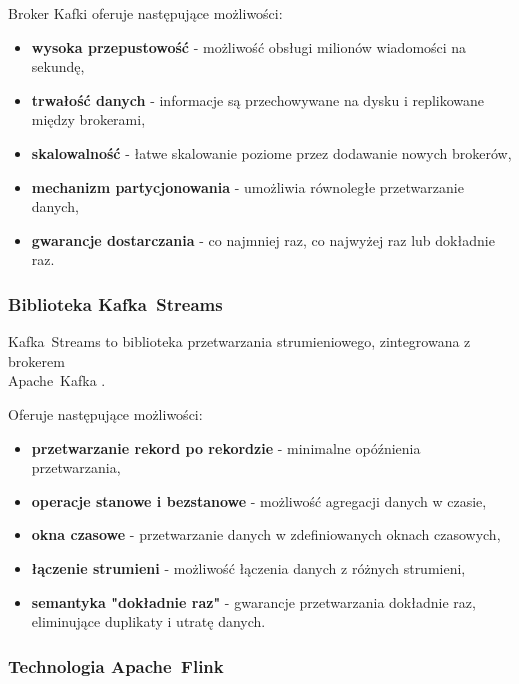 Broker Kafki oferuje następujące możliwości:

\begin{itemize}
    \item \textbf{wysoka przepustowość} - możliwość obsługi milionów wiadomości na sekundę,
    \item \textbf{trwałość danych} - informacje są przechowywane na dysku i replikowane między brokerami,
    \item \textbf{skalowalność} - łatwe skalowanie poziome przez dodawanie nowych brokerów,
    \item \textbf{mechanizm partycjonowania} - umożliwia równoległe przetwarzanie danych,
    \item \textbf{gwarancje dostarczania} - co najmniej raz, co najwyżej raz lub dokładnie raz.
\end{itemize}

\subsubsection{Biblioteka \mbox{Kafka Streams}}
\label{subsubsec:kafka_streams}

\mbox{Kafka Streams} to biblioteka przetwarzania strumieniowego, zintegrowana z brokerem \\ \mbox{Apache Kafka} \cite{kafka_streams}. 

\vspace{0.3em}

Oferuje następujące możliwości:

\begin{itemize}
    \item \textbf{przetwarzanie rekord po rekordzie} - minimalne opóźnienia przetwarzania,
    \item \textbf{operacje stanowe i bezstanowe} - możliwość agregacji danych w czasie,
    \item \textbf{okna czasowe} - przetwarzanie danych w zdefiniowanych oknach czasowych,
    \item \textbf{łączenie strumieni} - możliwość łączenia danych z różnych strumieni,
    \item \textbf{semantyka "dokładnie raz"} - gwarancje przetwarzania dokładnie raz, eliminujące duplikaty i utratę danych.
\end{itemize}

\subsubsection{Technologia \mbox{Apache Flink}}
\label{subsubsec:apache_flink}

